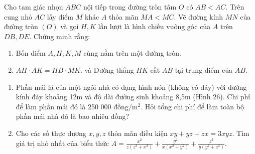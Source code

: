 \begin{ex} %
	Cho tam giác nhọn $ABC$ nội tiếp trong đường tròn tâm $O$ có $AB < AC$. Trên cung nhỏ $AC$ lấy điểm $M$ khác $A$ thỏa mãn $MA < MC$. Vẽ đường kính $MN$ của đường tròn $(O)$ và gọi $H, K$ lần lượt là hình chiếu vuông góc của $A$ trên $DB, DE$. Chứng minh rằng:
	\begin{enumerate}
		\item[a)] Bốn điểm $A, H, K, M$ cùng nằm trên một đường tròn.
		\item[b)] $AH \cdot AK = HB \cdot MK$. và Đường thẳng $HK$ cắt $AB$ tại trung điểm của $AB$. 
	\end{enumerate}
\end{ex}

\begin{ex} %
	\begin{enumerate}
		\item[a)] Phần mái lá của một ngôi nhà có dạng hình nón (không có đáy) với đường kính đáy khoảng 12m và độ dài đường sinh khoảng 8,5m (Hình 26). Chi phí để làm phần mái đó là 250 000 đồng/m$^2$. Hỏi tổng chi phí để làm toàn bộ phần mái nhà đó là bao nhiêu đồng?
		\item[b)] Cho các số thực dương $x, y, z$ thỏa mãn điều kiện $xy + yz + zx = 3xyz$.
		Tìm giá trị nhỏ nhất của biểu thức $A = \frac{x^2}{z(z^2+x^2)} + \frac{y^2}{x(x^2+y^2)} + \frac{z^2}{y(y^2+z^2)}$.
	\end{enumerate}
\end{ex}
